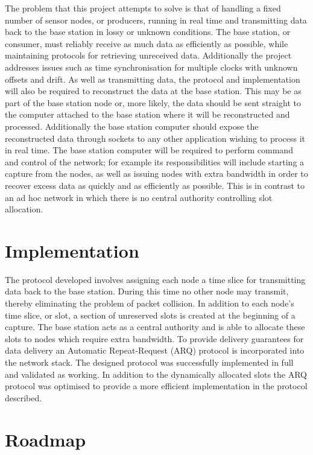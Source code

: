 \documentclass[parskip]{cs4rep}
\begin{document}
The problem that this project attempts to solve is that of handling a fixed number of sensor nodes, or producers, running in real time and transmitting data back to the base station in lossy or unknown conditions. The base station, or consumer, must reliably receive as much data as efficiently as possible, while maintaining protocols for retrieving unreceived data. Additionally the project addresses issues such as time synchronisation for multiple clocks with unknown offsets and drift. As well as transmitting data, the protocol and implementation will also be required to reconstruct the data at the base station. This may be as part of the base station node or, more likely, the data should be sent straight to the computer attached to the base station where it will be reconstructed and processed. Additionally the base station computer should expose the reconstructed data through sockets to any other application wishing to process it in real time. The base station computer will be required to perform command and control of the network; for example its responsibilities will include starting a capture from the nodes, as well as issuing nodes with extra bandwidth in order to recover excess data as quickly and as efficiently as possible. This is in contrast to an ad hoc network in which there is no central authority controlling slot allocation.

\section{Implementation}

The protocol developed involves assigning each node a time slice for transmitting data back to the base station. During this time no other node may transmit, thereby eliminating the problem of packet collision. In addition to each node's time slice, or slot, a section of unreserved slots is created at the beginning of a capture. The base station acts as a central authority and is able to allocate these slots to nodes which require extra bandwidth. To provide delivery guarantees for data delivery an Automatic Repeat-Request (ARQ) protocol is incorporated into the network stack. The designed protocol was successfully implemented in full and validated as working. In addition to the dynamically allocated slots the ARQ protocol was optimised to provide a more efficient implementation in the protocol described.

\newpage
\section{Roadmap}
\end{document}

